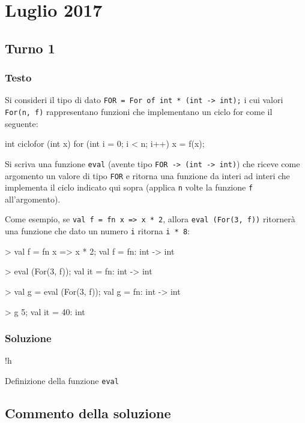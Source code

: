 \section{Luglio 2017}

\subsection{Turno 1}

\subsubsection{Testo}

Si consideri il tipo di dato \texttt{FOR = For of int * (int -> int);} i cui valori \texttt{For(n, f)} rappresentano funzioni che implementano un ciclo for come il seguente:

\begin{cppcode}
int ciclofor (int x) {
	for (int i = 0; i < n; i++) {
		x = f(x);
	}
}
\end{cppcode}

Si scriva una funzione \texttt{eval} (avente tipo \texttt{FOR -> (int -> int)}) che riceve come argomento un valore di tipo \texttt{FOR} e ritorna una funzione da interi ad interi che implementa il ciclo indicato qui sopra (applica \texttt{n} volte la funzione \texttt{f} all'argomento).

\medskip
Come esempio, se \texttt{val f = fn x => x * 2}, allora \texttt{eval (For(3, f))} ritornerà una funzione che dato un numero \texttt{i} ritorna \texttt{i * 8}:

\begin{smlcode}
> val f = fn x => x * 2;
val f = fn: int -> int

> eval (For(3, f));
val it = fn: int -> int

> val g = eval (For(3, f));
val g = fn: int -> int

> g 5;
val it = 40: int
\end{smlcode}

\subsubsection{Soluzione}

\begin{listing}{!h}
\caption[]{Definizione della funzione \texttt{eval}}
\end{listing}

\subsection{Commento della soluzione}

